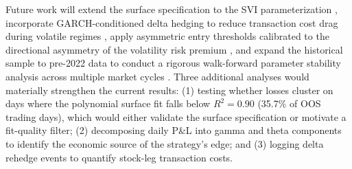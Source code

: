 \documentclass[10pt,twocolumn]{article}
\begin{document}
Future work will extend the surface specification to the SVI
parameterization \cite{gatheral2006}, incorporate GARCH-conditioned delta
hedging to reduce transaction cost drag during volatile regimes
\cite{bollerslev1986}, apply asymmetric entry thresholds calibrated to the
directional asymmetry of the volatility risk premium \cite{carr2009}, and
expand the historical sample to pre-2022 data to conduct a rigorous
walk-forward parameter stability analysis across multiple market cycles
\cite{bailey2014}.  Three additional analyses would materially strengthen
the current results: (1) testing whether losses cluster on days where the
polynomial surface fit falls below $R^2 = 0.90$ (35.7\% of OOS trading
days), which would either validate the surface specification or motivate a
fit-quality filter; (2) decomposing daily P\&L into gamma and theta
components to identify the economic source of the strategy's edge; and
(3) logging delta rehedge events to quantify stock-leg transaction costs.
\end{document}
